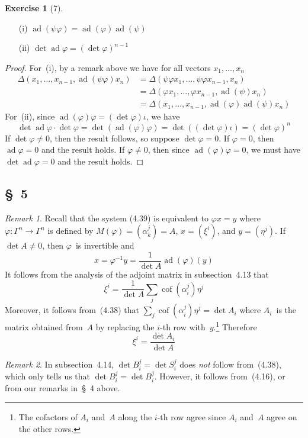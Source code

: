 \documentclass[letterpaper,12pt]{article}
\DeclareMathOperator{\ad}{ad}
\DeclareMathOperator{\cof}{cof}
\newcommand{\mult}{\cdot}
\theoremstyle{definition}
\newtheorem*{exer}{Exercise}
\theoremstyle{remark}
\newtheorem*{rmk}{Remark}
\begin{document}
\begin{exer}[7]\
\begin{enumerate}
\item[(i)] \(\ad(\psi\varphi)=\ad(\varphi)\ad(\psi)\)
\item[(ii)] \(\det\ad\varphi=(\det\varphi)^{n-1}\)
\end{enumerate}
\end{exer}
\begin{proof}
For~(i), by a remark above we have for all vectors \(x_1,\ldots,x_n\)
\begin{align*}
\Delta(x_1,\ldots,x_{n-1},\ad(\psi\varphi)x_n)&=\Delta(\psi\varphi x_1,\ldots,\psi\varphi x_{n-1},x_n)\\
	&=\Delta(\varphi x_1,\ldots,\varphi x_{n-1},\ad(\psi)x_n)\\
	&=\Delta(x_1,\ldots,x_{n-1},\ad(\varphi)\ad(\psi)x_n)
\end{align*}
For~(ii), since \(\ad(\varphi)\varphi=(\det\varphi)\iota\), we have
\[\det\ad\varphi\mult\det\varphi=\det(\ad(\varphi)\varphi)=\det((\det\varphi)\iota)=(\det\varphi)^n\]
If \(\det\varphi\ne0\), then the result follows, so suppose \(\det\varphi=0\). If \(\varphi=0\), then \(\ad\varphi=0\) and the result holds. If \(\varphi\ne 0\), then since \(\ad(\varphi)\varphi=0\), we must have \(\det\ad\varphi=0\) and the result holds.
\end{proof}

\subsection*{\S~5}
\begin{rmk}
Recall that the system (4.39) is equivalent to \(\varphi x=y\) where \(\varphi:\Gamma^n\to\Gamma^n\) is defined by \(M(\varphi)=(\alpha^j_k)=A\), \(x=(\xi^i)\), and \(y=(\eta^j)\). If \(\det A\ne0\), then \(\varphi\)~is invertible and
\[x=\varphi^{-1}y=\frac{1}{\det A}\ad(\varphi)(y)\]
It follows from the analysis of the adjoint matrix in subsection~4.13 that
\[\xi^i=\frac{1}{\det A}\sum_j\cof(\alpha^j_i)\eta^j\]
Moreover, it follows from~(4.38) that \(\sum_j\cof(\alpha^j_i)\eta^j=\det A_i\) where \(A_i\)~is the matrix obtained from~\(A\) by replacing the \(i\)-th row with~\(y\).\footnote{The cofactors of \(A_i\) and~\(A\) along the \(i\)-th row agree since \(A_i\) and~\(A\) agree on the other rows.} Therefore
\[\xi^i=\frac{\det A_i}{\det A}\]
\end{rmk}

\begin{rmk}
In subsection~4.14, \(\det B^j_i=\det S^j_i\) does \emph{not} follow from~(4.38), which only tells us that \(\det B^j_i=\det B^j_i\). However, it follows from~(4.16), or from our remarks in~\S~4 above.
\end{rmk}
\end{document}
